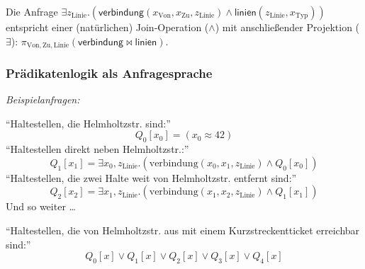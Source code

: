 \documentclass[aspectratio=1610,onlymath]{beamer}
\begin{document}
\begin{frame}
Die Anfrage \alert{$\exists z_{\text{Linie}}.(\textsf{verbindung}(x_\text{Von},x_\text{Zu}, z_{\text{Linie}})\wedge \textsf{linien}(z_{\text{Linie}},x_{\text{Typ}}))$}
entspricht einer (natürlichen) Join-Operation ($\wedge$) mit anschließender Projektion ($\exists$):
\alert{$\pi_{\text{Von},\text{Zu},\text{Linie}}(\textsf{verbindung}\bowtie\textsf{linien})$}.

\end{frame}

\begin{frame}\frametitle{Prädikatenlogik als Anfragesprache}

\emph{Beispielanfragen:}\medskip

\alert{``Haltestellen, die Helmholtzstr. sind:''}
%
\[ Q_0[x_0] = (x_0\approx 42) \]\pause
%
\alert{``Haltestellen direkt neben Helmholtzstr.:''}
\[
   Q_1[x_1] = \exists x_0,z_\text{Linie}.(\text{verbindung}(x_0,x_1,z_\text{Linie})\wedge Q_0[x_0])
\]\pause
\alert{``Haltestellen, die zwei Halte weit von Helmholtzstr. entfernt sind:''}
\[
   Q_2[x_2] = \exists x_1,z_\text{Linie}.(\text{verbindung}(x_1,x_2,z_\text{Linie})\wedge Q_1[x_1])
\]\pause
Und so weiter \ldots\bigskip
% 

\alert{``Haltestellen, die von Helmholtzstr. aus mit einem Kurzstreckentticket erreichbar sind:''}
\[
	Q_0[x]\vee Q_1[x]\vee Q_2[x]\vee Q_3[x]\vee Q_4[x]
\]
% 
% 
\end{frame}
\end{document}
